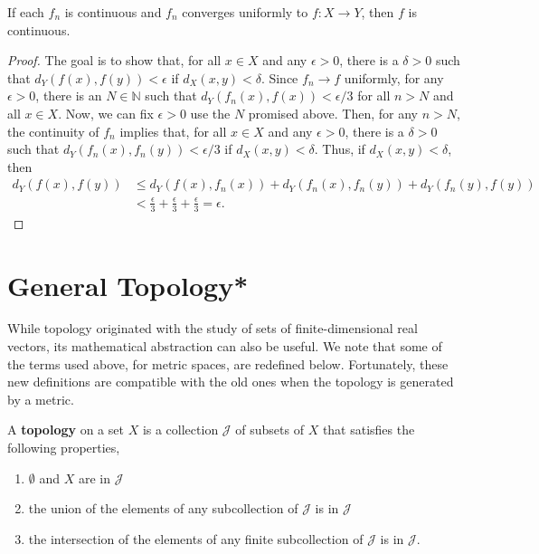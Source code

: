 \begin{theorem}
If each $f_n$ is continuous and $f_n$ converges uniformly to $f \colon X \to Y$, then $f$ is continuous.
\end{theorem}
\begin{proof}
The goal is to show that, for all $x\in X$ and any $\epsilon > 0$, there is a $\delta>0$ such that $d_Y (f (x),f (y)) < \epsilon$ if $d_X (x,y) < \delta$.
Since $f_n \to f$ uniformly, for any $\epsilon >0$, there is an $N\in \mathbb{N}$ such that $d_Y (f_n (x), f(x) ) < \epsilon / 3$ for all $n > N$ and all $x\in X$.
Now, we can fix $\epsilon > 0$ use the $N$ promised above.
Then, for any $n>N$, the continuity of $f_n$ implies that, for all $x\in X$ and any $\epsilon >0$, there is a $\delta>0$ such that $d_Y (f_n (x),f_n(y)) < \epsilon/3$ if $d_X (x,y) < \delta$.
Thus, if $d_X (x,y) < \delta$, then
\begin{align*}
d_Y (f(x),f(y))
&\leq d_Y (f(x),f_n (x)) + d_Y (f_n (x) ,f_n (y) ) + d_Y (f_n (y), f(y) ) \\
& < \frac{\epsilon}{3} + \frac{\epsilon}{3} + \frac{\epsilon}{3} = \epsilon.
\end{align*}
\end{proof}

\section{General Topology*}

While topology originated with the study of sets of finite-dimensional real vectors, its mathematical abstraction can also be useful.
We note that some of the terms used above, for metric spaces, are redefined below.
Fortunately, these new definitions are compatible with the old ones when the topology is generated by a metric.

\begin{definition}
A \textbf{topology} on a set $X$ is a collection $\mathcal{J}$ of subsets of $X$ that satisfies the following properties,
\begin{enumerate}
\item $\emptyset$ and $X$ are in $\mathcal{J}$
\item the union of the elements of any subcollection of $\mathcal{J}$ is in $\mathcal{J}$
\item the intersection of the elements of any finite subcollection of $\mathcal{J}$ is in $\mathcal{J}$.
\end{enumerate}
\end{definition}

